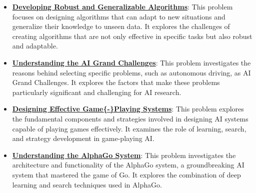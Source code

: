 \documentclass{article}%
\begin{document}
\begin{itemize}[leftmargin=*]
\item \href{https://purdue.brightspace.com/d2l/common/assets/pdfjs-d2l-dist/1.0.14-legacy/web/viewer.html?file=\%2Fcontent\%2Fenforced\%2F1095467-wl.202510.CS.24300.001\%2F02L2-Intro.pdf\%3Fou\%3D1095467\&lang=en-us\&container=d2l-fileviewer-rendered-pdf\&fullscreen=d2l-fileviewer-rendered-pdf-dialog\&height=667#page=36}{\textbf{Developing Robust and Generalizable Algorithms}}: This problem focuses on designing algorithms that can adapt to new situations and generalize their knowledge to unseen data. It explores the challenges of creating algorithms that are not only effective in specific tasks but also robust and adaptable.%
\item \href{https://purdue.brightspace.com/d2l/common/assets/pdfjs-d2l-dist/1.0.14-legacy/web/viewer.html?file=\%2Fcontent\%2Fenforced\%2F1095467-wl.202510.CS.24300.001\%2F02L2-Intro.pdf\%3Fou\%3D1095467\&lang=en-us\&container=d2l-fileviewer-rendered-pdf\&fullscreen=d2l-fileviewer-rendered-pdf-dialog\&height=667#page=43}{\textbf{Understanding the AI Grand Challenges}}: This problem investigates the reasons behind selecting specific problems, such as autonomous driving, as AI Grand Challenges. It explores the factors that make these problems particularly significant and challenging for AI research.%
\item \href{https://purdue.brightspace.com/d2l/common/assets/pdfjs-d2l-dist/1.0.14-legacy/web/viewer.html?file=\%2Fcontent\%2Fenforced\%2F1095467-wl.202510.CS.24300.001\%2F02L2-Intro.pdf\%3Fou\%3D1095467\&lang=en-us\&container=d2l-fileviewer-rendered-pdf\&fullscreen=d2l-fileviewer-rendered-pdf-dialog\&height=667#page=47}{\textbf{Designing Effective Game\{{-}\}Playing Systems}}: This problem explores the fundamental components and strategies involved in designing AI systems capable of playing games effectively. It examines the role of learning, search, and strategy development in game{-}playing AI.%
\item \href{https://purdue.brightspace.com/d2l/common/assets/pdfjs-d2l-dist/1.0.14-legacy/web/viewer.html?file=\%2Fcontent\%2Fenforced\%2F1095467-wl.202510.CS.24300.001\%2F02L2-Intro.pdf\%3Fou\%3D1095467\&lang=en-us\&container=d2l-fileviewer-rendered-pdf\&fullscreen=d2l-fileviewer-rendered-pdf-dialog\&height=667#page=50}{\textbf{Understanding the AlphaGo System}}: This problem investigates the architecture and functionality of the AlphaGo system, a groundbreaking AI system that mastered the game of Go. It explores the combination of deep learning and search techniques used in AlphaGo.%
\end{itemize}%
\end{document}
